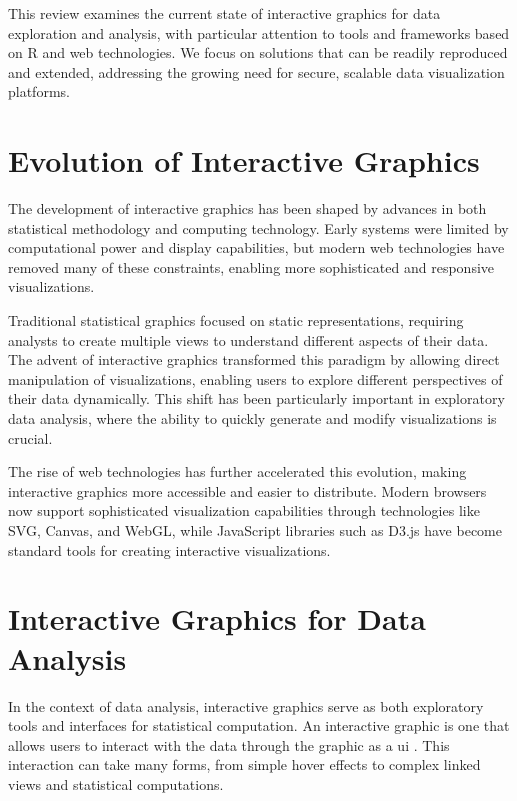 \documentclass{article}
\begin{document}
This review examines the current state of interactive graphics for data exploration and analysis, with particular attention to tools and frameworks based on R and web technologies. We focus on solutions that can be readily reproduced and extended, addressing the growing need for secure, scalable data visualization platforms.

\section{Evolution of Interactive Graphics}
\label{sec:evolution}

The development of interactive graphics has been shaped by advances in both statistical methodology and computing technology. Early systems were limited by computational power and display capabilities, but modern web technologies have removed many of these constraints, enabling more sophisticated and responsive visualizations.

Traditional statistical graphics focused on static representations, requiring analysts to create multiple views to understand different aspects of their data. The advent of interactive graphics transformed this paradigm by allowing direct manipulation of visualizations, enabling users to explore different perspectives of their data dynamically. This shift has been particularly important in exploratory data analysis, where the ability to quickly generate and modify visualizations is crucial.

The rise of web technologies has further accelerated this evolution, making interactive graphics more accessible and easier to distribute. Modern browsers now support sophisticated visualization capabilities through technologies like SVG, Canvas, and WebGL, while JavaScript libraries such as D3.js have become standard tools for creating interactive visualizations.

\section{Interactive Graphics for Data Analysis}
\label{sec:interactive-graphics}

In the context of data analysis, interactive graphics serve as both exploratory tools and interfaces for statistical computation. An interactive graphic is one that allows users to interact with the data through the graphic as a \gls{ui} \parencite{Young2011}. This interaction can take many forms, from simple hover effects to complex linked views and statistical computations.
\end{document}
